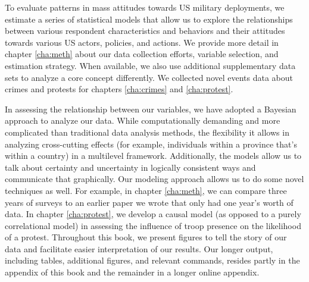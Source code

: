 

To evaluate patterns in mass attitudes towards US military deployments, we estimate a series of statistical models that allow us to explore the relationships between various respondent characteristics and behaviors and their attitudes towards various US actors, policies, and actions. We provide more detail in chapter \ref{cha:meth} about our data collection efforts, variable selection, and estimation strategy. When available, we also use additional supplementary data sets to analyze a core concept differently. We collected novel events data about crimes and protests for chapters \ref{cha:crimes} and \ref{cha:protest}.

In assessing the relationship between our variables, we have adopted a Bayesian approach to analyze our data. While computationally demanding and more complicated than traditional data analysis methods, the flexibility it allows in analyzing cross-cutting effects (for example, individuals within a province that's within a country) in a multilevel framework. Additionally, the models allow us to talk about certainty and uncertainty in logically consistent ways and communicate that graphically. Our modeling approach allows us to do some novel techniques as well. For example, in chapter \ref{cha:meth}, we can compare three years of surveys to an earlier paper we wrote that only had one year's worth of data. In chapter \ref{cha:protest}, we develop a causal model (as opposed to a purely correlational model) in assessing the influence of troop presence on the likelihood of a protest. Throughout this book, we present figures to tell the story of our data and facilitate easier interpretation of our results. Our longer output, including tables, additional figures, and relevant commands, resides partly in the appendix of this book and the remainder in a longer online appendix.

